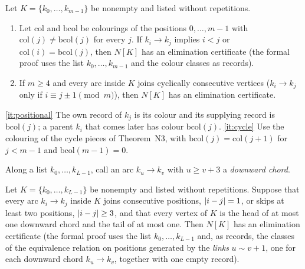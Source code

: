 \begin{lemma}\label{lem:cycle-cert}
Let $K=\{k_0,\dots,k_{m-1}\}$ be nonempty and listed without repetitions.
\begin{enumerate}[label=(\alph*)]
\item\label{it:positional} Let $\mathrm{col}$ and $\mathrm{bcol}$ be colourings of the positions $0,\dots,m-1$ with
$\mathrm{col}(j)\ne\mathrm{bcol}(j)$ for every $j$. If $k_i\to k_j$ implies $i<j$ or $\mathrm{col}(i)=\mathrm{bcol}(j)$,
then $N[K]$ has an elimination certificate (the formal proof uses the list $k_0,\dots,k_{m-1}$ and the colour classes as
records).
\item\label{it:cycle} If $m\ge4$ and every arc inside $K$ joins cyclically consecutive vertices ($k_i\to k_j$ only if
$i\equiv j\pm1\pmod m$), then $N[K]$ has an elimination certificate.
\end{enumerate}
\end{lemma}

\begin{outline}
\ref{it:positional} The own record of $k_j$ is its colour and its supplying record is $\mathrm{bcol}(j)$; a parent $k_i$
that comes later has colour $\mathrm{bcol}(j)$. \ref{it:cycle} Use the colouring of the cycle pieces of Theorem~N3, with
$\mathrm{bcol}(j)=\mathrm{col}(j+1)$ for $j<m-1$ and $\mathrm{bcol}(m-1)=0$.
\end{outline}

Along a list $k_0,\dots,k_{L-1}$, call an arc $k_u\to k_v$ with $u\ge v+3$ a \emph{downward chord}.

\begin{lemma}\label{lem:S}
Let $K=\{k_0,\dots,k_{L-1}\}$ be nonempty and listed without repetitions. Suppose that every arc $k_i\to k_j$ inside
$K$ joins consecutive positions, $\lvert i-j \rvert=1$, or skips at least two positions, $\lvert i-j \rvert\ge3$, and that every vertex
of $K$ is the head of at most one downward chord and the tail of at most one. Then $N[K]$ has an elimination certificate
(the formal proof uses the list $k_0,\dots,k_{L-1}$ and, as records, the classes of the equivalence relation on positions
generated by the \emph{links} $u\sim v+1$, one for each downward chord $k_u\to k_v$, together with one empty
record).
\end{lemma}

